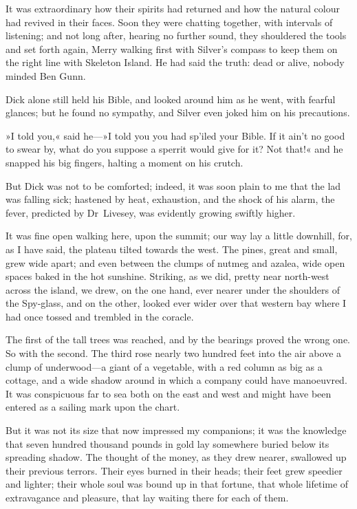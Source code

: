 It was extraordinary how their spirits had returned and how the natural colour had revived in their faces. Soon they were chatting together, with intervals of listening; and not long after, hearing no further sound, they shouldered the tools and set forth again, Merry walking first with Silver's compass to keep them on the right line with Skeleton Island. He had said the truth: dead or alive, nobody minded Ben Gunn.

Dick alone still held his Bible, and looked around him as he went, with fearful glances; but he found no sympathy, and Silver even joked him on his precautions.

»I told you,« said he—»I told you you had sp'iled your Bible. If it ain't no good to swear by, what do you suppose a sperrit would give for it? Not that!« and he snapped his big fingers, halting a moment on his crutch.

But Dick was not to be comforted; indeed, it was soon plain to me that the lad was falling sick; hastened by heat, exhaustion, and the shock of his alarm, the fever, predicted by Dr~Livesey, was evidently growing swiftly higher.

It was fine open walking here, upon the summit; our way lay a little downhill, for, as I have said, the plateau tilted towards the west. The pines, great and small, grew wide apart; and even between the clumps of nutmeg and azalea, wide open spaces baked in the hot sunshine. Striking, as we did, pretty near north-west across the island, we drew, on the one hand, ever nearer under the shoulders of the Spy-glass, and on the other, looked ever wider over that western bay where I had once tossed and trembled in the coracle.

The first of the tall trees was reached, and by the bearings proved the wrong one. So with the second. The third rose nearly two hundred feet into the air above a clump of underwood—a giant of a vegetable, with a red column as big as a cottage, and a wide shadow around in which a company could have manoeuvred. It was conspicuous far to sea both on the east and west and might have been entered as a sailing mark upon the chart.

But it was not its size that now impressed my companions; it was the knowledge that seven hundred thousand pounds in gold lay somewhere buried below its spreading shadow. The thought of the money, as they drew nearer, swallowed up their previous terrors. Their eyes burned in their heads; their feet grew speedier and lighter; their whole soul was bound up in that fortune, that whole lifetime of extravagance and pleasure, that lay waiting there for each of them.

